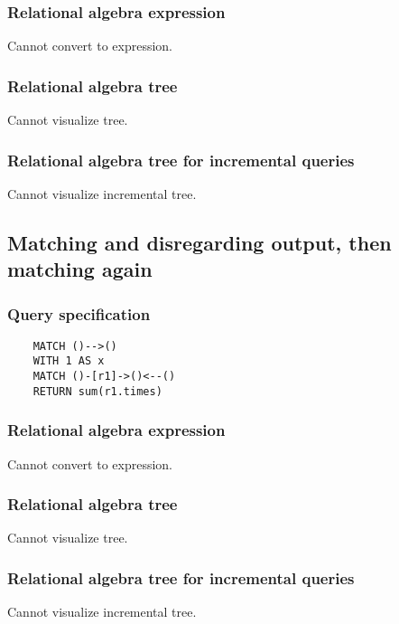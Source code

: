	\subsubsection*{Relational algebra expression}

	Cannot convert to expression.

	\subsubsection*{Relational algebra tree}

	Cannot visualize tree.

	\subsubsection*{Relational algebra tree for incremental queries}

	Cannot visualize incremental tree.
	\subsection{Matching and disregarding output, then matching again}

	\subsubsection*{Query specification}

	\begin{lstlisting}
	MATCH ()-->()
	WITH 1 AS x
	MATCH ()-[r1]->()<--()
	RETURN sum(r1.times)
	\end{lstlisting}


	\subsubsection*{Relational algebra expression}

	Cannot convert to expression.

	\subsubsection*{Relational algebra tree}

	Cannot visualize tree.

	\subsubsection*{Relational algebra tree for incremental queries}

	Cannot visualize incremental tree.
